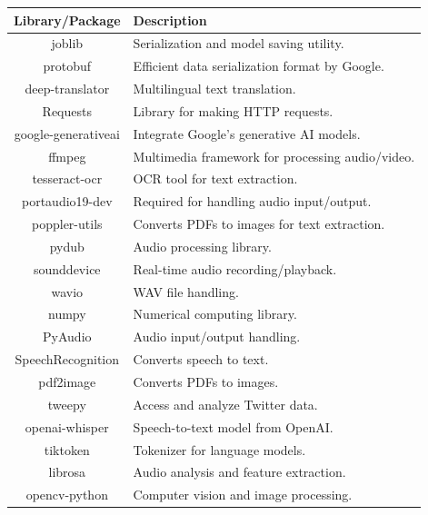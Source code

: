 \pagebreak
\begin{table}[H]
    \centering
    \renewcommand{\arraystretch}{1.2}
    \begin{tabular}{|c|p{12cm}|}
        \hline
        \textbf{Library/Package} & \textbf{Description} \\
        \hline
        joblib & Serialization and model saving utility. \\
        \hline
        protobuf & Efficient data serialization format by Google. \\
        \hline
        deep-translator & Multilingual text translation. \\
        \hline
        Requests & Library for making HTTP requests. \\
        \hline
        google-generativeai & Integrate Google’s generative AI models. \\
        \hline
        ffmpeg & Multimedia framework for processing audio/video. \\
        \hline
        tesseract-ocr & OCR tool for text extraction. \\
        \hline
        portaudio19-dev & Required for handling audio input/output. \\
        \hline
        poppler-utils & Converts PDFs to images for text extraction. \\
        \hline
        pydub & Audio processing library. \\
        \hline
        sounddevice & Real-time audio recording/playback. \\
        \hline
        wavio & WAV file handling. \\
        \hline
        numpy & Numerical computing library. \\
        \hline
        PyAudio & Audio input/output handling. \\
        \hline
        SpeechRecognition & Converts speech to text. \\
        \hline
        pdf2image & Converts PDFs to images. \\
        \hline
        tweepy & Access and analyze Twitter data. \\
        \hline
        openai-whisper & Speech-to-text model from OpenAI. \\
        \hline
        tiktoken & Tokenizer for language models. \\
        \hline
        librosa & Audio analysis and feature extraction. \\
        \hline
        opencv-python & Computer vision and image processing. \\

\end{tabular}
\end{table}
